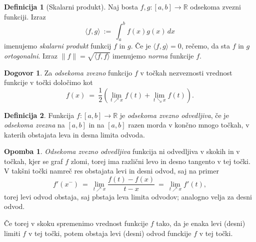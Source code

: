 \documentclass[11pt]{article}
\theoremstyle{definition}
\newtheorem{definicija}{Definicija}[section]
\theoremstyle{definition}
\theoremstyle{definition}
\theoremstyle{theorem}
\newtheorem*{dogovor}{Dogovor}
\newtheorem*{opomba}{Opomba}
\begin{document}
\begin{definicija}[Skalarni produkt]

Naj bosta $f, g: [a, b] \rightarrow \mathbb{R}$ odsekoma zvezni funkciji. Izraz
$$\langle f, g \rangle ~:=~ \int_{a}^{b} f(x) g(x)\,dx$$
imenujemo \textit{skalarni produkt} funkcij $f$ in $g$. Če je $\langle f, g \rangle = 0$, rečemo, da sta $f$ in $g$ \textit{ortogonalni}. Izraz $\| f \| = \sqrt{\langle f, f \rangle}$ imenujemo \textit{norma} funkcije $f$.

\end{definicija}
\vspace{0.5cm}

\begin{dogovor}

Za \textit{odsekoma zvezno} funkcijo $f$ v točkah nezveznosti vrednost funkcije v točki določimo kot
$$f(x) ~=~ \frac{1}{2} \left( \lim_{t \nearrow x} f(t) + \lim_{t \searrow x} f(t) \right).$$

\end{dogovor}
\vspace{0.5cm}

\begin{definicija}

Funkcija $f:[a, b] \rightarrow \mathbb{R}$ je \textit{odsekoma zvezno odvedljiva}, če je \textit{odsekoma zvezna} na $[a, b]$ in  na $[a, b]$ razen morda v končno mnogo točkah, v katerih obstajata leva in desna limita odvoda.

\end{definicija}
\vspace{0.5cm}

\begin{opomba}

\textit{Odsekoma zvezno odvedljiva} funkcija ni odvedljiva v skokih in v točkah, kjer se graf $f$ zlomi, torej ima različni levo in desno tangento v tej točki. V takšni točki namreč res obstajata levi in desni odvod, saj na primer 
$$f'(x^-) ~=~ \lim_{t \nearrow x} \frac{f(t) - f(x)}{t-x} ~=~ \lim_{t \nearrow x} f'(t),$$
torej levi odvod obstaja, saj pbstaja leva limita odvodov; analogno velja za desni odvod.

Če torej v skoku spremenimo vrednost funkcije $f$ tako, da je enaka levi (desni) limiti $f$ v tej točki, potem obstaja levi (desni) odvod funckije $f$ v tej točki.

\end{opomba}
\vspace{0.5cm}
\end{document}
